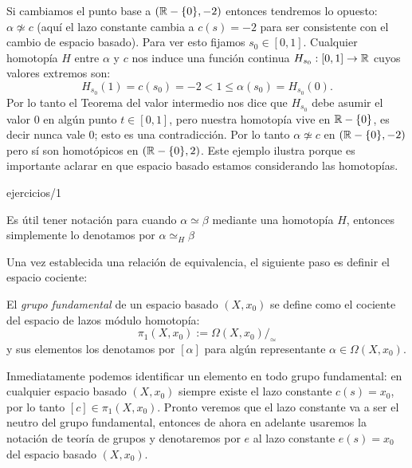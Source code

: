 \documentclass[../../topologia_algebraica]{subfiles}
\begin{document}
\begin{ejemplo}
\begin{enumerate}
    Si cambiamos el punto base a $(\mathbb{R}-\{0\},-2)$ entonces tendremos lo opuesto: $\alpha\not\simeq c$
    (aqu\'i el lazo constante cambia a $c(s)=-2$ para ser consistente con el cambio de espacio basado).
    Para ver esto fijamos $s_0\in[0,1]$. Cualquier homotop\'ia $H$ entre $\alpha$ y $c$ nos induce
    una funci\'on continua $H_{s_0}:[0,1]\rightarrow\mathbb{R}$ cuyos valores extremos son:
    \[
      H_{s_0}(1)=c(s_0)=-2<1\leq \alpha(s_0)=H_{s_0}(0).
    \]
    Por lo tanto el Teorema del valor intermedio nos dice que $H_{s_0}$ debe asumir el valor $0$ en
    alg\'un punto $t\in[0,1]$, pero nuestra homotop\'ia vive en $\mathbb{R}-\{0\}$, es decir nunca vale 0;
    esto es una contradicci\'on. Por lo tanto $\alpha\not\simeq c$ en $(\mathbb{R}-\{0\},-2)$ pero s\'i son
    homot\'opicos en $(\mathbb{R}-\{0\},2)$. Este ejemplo ilustra porque es importante aclarar en que espacio
    basado estamos considerando las homotop\'ias.
  \end{enumerate}
\end{ejemplo}

{ejercicios/1}%

\begin{nota}
  Es \'util tener notaci\'on para cuando $\alpha\simeq\beta$ mediante una homotop\'ia $H$, entonces
  simplemente lo denotamos por $\alpha\simeq_H\beta$
\end{nota}

Una vez establecida una relaci\'on de equivalencia, el siguiente paso es definir el espacio cociente:
\begin{defin}
  El \emph{grupo fundamental} de un espacio basado $(X,x_0)$ se define como el cociente del espacio de
  lazos m\'odulo homotop\'ia:
  \[
    \pi_1(X,x_0):=\Omega(X,x_0)/_{\simeq}
  \]
  y sus elementos los denotamos por $[\alpha]$ para alg\'un representante $\alpha\in\Omega(X,x_0)$.
\end{defin}

Inmediatamente podemos identificar un elemento en todo grupo fundamental: en cualquier espacio basado
$(X,x_0)$ siempre existe el lazo constante $c(s)=x_0$, por lo tanto $[c]\in\pi_1(X,x_0)$. Pronto veremos
que el lazo constante va a ser el neutro del grupo fundamental, entonces de ahora en adelante usaremos
la notaci\'on de teor\'ia de grupos y denotaremos por $e$ al lazo constante $e(s)=x_0$ del espacio
basado $(X,x_0)$.
\end{document}
